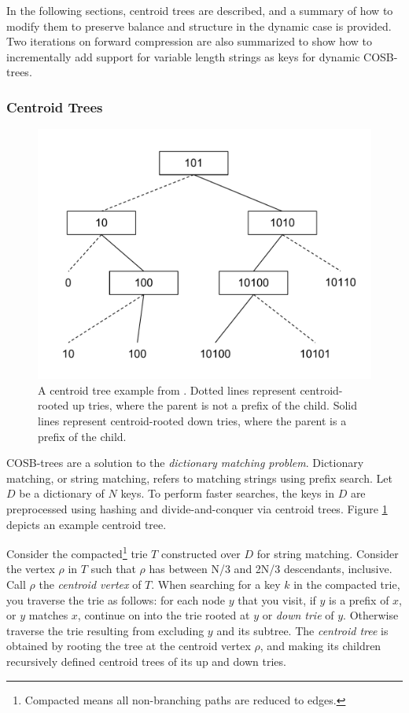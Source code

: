 \documentclass[preprint]{style}
\begin{document}
In the following sections, centroid trees are described, and a summary of
how to modify them to preserve balance and structure in the dynamic case is
provided. Two iterations on forward compression are also summarized to show
how to incrementally add support for variable length strings as keys for
dynamic COSB-trees.

\subsubsection{Centroid Trees} %
\begin{figure}

\begin{center}
	\includegraphics[width=0.8\columnwidth]{figures/centroidtreeexample.pdf}
\end{center}

\caption{A centroid tree example from \cite{BenderFaKu06}. Dotted lines
represent centroid-rooted up tries, where the parent is not a prefix of the
child. Solid lines represent centroid-rooted down tries, where the parent is a
prefix of the child.}
\label{fig:centroid}
\end{figure}

COSB-trees are a solution to the \textit{dictionary matching problem}.
Dictionary matching, or string matching, refers to matching strings using
prefix search. Let $D$ be a dictionary of $N$ keys. To perform faster searches,
the keys in $D$ are preprocessed using hashing and divide-and-conquer via
centroid trees. Figure \ref{fig:centroid} depicts an example centroid tree.

Consider the compacted\footnote{Compacted means all non-branching paths are
reduced to edges.} trie $T$ constructed over $D$ for string matching.  Consider
the vertex $\rho$ in $T$ such that $\rho$ has between N/3 and 2N/3 descendants,
inclusive. Call $\rho$ the \emph{centroid vertex} of $T$. When searching for a
key $k$ in the compacted trie, you traverse the trie as follows: for each node
$y$ that you visit, if $y$ is a prefix of $x$, or $y$ matches $x$, continue on
into the trie rooted at $y$ or \emph{down trie} of $y$. Otherwise traverse the
trie resulting from excluding $y$ and its subtree. The \emph{centroid tree} is
obtained by rooting the tree at the centroid vertex $\rho$, and making its
children recursively defined centroid trees of its up and down tries. 
\end{document}

